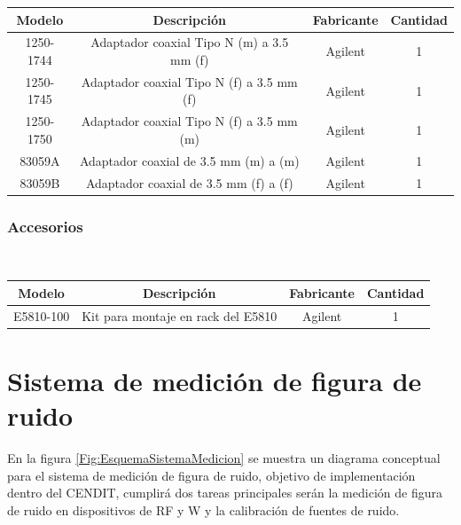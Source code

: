 		\begin{table}[h!]
			\centering
						
			\tablefirsthead{}
			\tablehead{}
			\tabletail{}
			\tablelasttail{}
			\begin{tabular}{|c|c|c|c|}
				\hline
				 Modelo 	& Descripción & Fabricante & Cantidad \\
				\hline
				 1250-1744 	& Adaptador coaxial Tipo N (m) a 3.5 mm (f) & Agilent & 1 \\
				\hline
				 1250-1745 	& Adaptador coaxial Tipo N (f) a 3.5 mm (f) & Agilent & 1 \\
				\hline
				 1250-1750 	& Adaptador coaxial Tipo N (f) a 3.5 mm (m) & Agilent & 1 \\
				\hline
				 83059A 	& Adaptador coaxial de 3.5 mm (m) a (m) & Agilent &	 1 \\
				\hline
				 83059B 	& Adaptador coaxial de 3.5 mm (f) a (f) & Agilent & 1 \\
				\hline
			\end{tabular}
		\end{table}
	
	\subsubsection{Accesorios}	
		~		
		
		\begin{table}[h!]
			\centering			
			
			\tablefirsthead{}
			\tablehead{}
			\tabletail{}
			\tablelasttail{}
			\begin{tabular}{|c|c|c|c|}
				\hline
				 Modelo	 	& Descripción & Fabricante & Cantidad \\
				\hline
				 E5810-100 	& Kit para montaje en rack del E5810 & Agilent & 1 \\
				\hline
			\end{tabular}
		\end{table}
	
	\clearpage
	
	\section{Sistema de medición de figura de ruido}
	
	En la figura \ref{Fig:EsquemaSistemaMedicion} se muestra un diagrama conceptual para el sistema de medición de figura de ruido, objetivo de implementación dentro del CENDIT, cumplirá dos tareas principales serán la medición de figura de ruido en dispositivos de RF y {\textmu}W y la calibración de fuentes de ruido.
	
